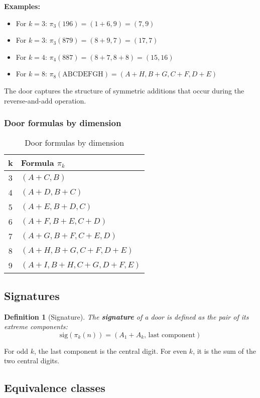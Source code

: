 \documentclass[12pt,a4paper]{article}
\newtheorem{definition}{Definition}[section]
\theoremstyle{remark}
\begin{document}
\textbf{Examples:}
\begin{itemize}
\item For $k=3$: $\pi_3(196) = (1+6, 9) = (7, 9)$
\item For $k=3$: $\pi_3(879) = (8+9, 7) = (17, 7)$
\item For $k=4$: $\pi_4(887) = (8+7, 8+8) = (15, 16)$
\item For $k=8$: $\pi_8(\text{ABCDEFGH}) = (A+H, B+G, C+F, D+E)$
\end{itemize}

The door captures the structure of symmetric additions that occur during the reverse-and-add operation.

\subsubsection{Door formulas by dimension}

\begin{table}[h]
\centering
\caption{Door formulas by dimension}
\begin{tabular}{cl}
\toprule
\textbf{k} & \textbf{Formula $\pi_k$}\\
\midrule
3 & $(A+C, B)$\\
4 & $(A+D, B+C)$\\
5 & $(A+E, B+D, C)$\\
6 & $(A+F, B+E, C+D)$\\
7 & $(A+G, B+F, C+E, D)$\\
8 & $(A+H, B+G, C+F, D+E)$\\
9 & $(A+I, B+H, C+G, D+F, E)$\\
\bottomrule
\end{tabular}
\end{table}

\subsection{Signatures}

\begin{definition}[Signature]
The \textbf{signature} of a door is defined as the pair of its extreme components:
\[
\text{sig}(\pi_k(n)) = (A_1 + A_k, \, \text{last component})
\]
\end{definition}

For odd $k$, the last component is the central digit. For even $k$, it is the sum of the two central digits.

\subsection{Equivalence classes}
\end{document}
